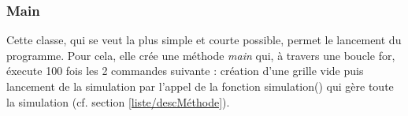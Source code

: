 \documentclass[french]{article}
\begin{document}


\subsubsection{Main}
Cette classe, qui se veut la plus simple et courte possible, permet le lancement du programme. Pour cela, elle crée une méthode \textit{main} qui, à travers une boucle for, éxecute 100 fois les 2 commandes suivante : création d'une grille vide puis lancement de la simulation par l'appel de la fonction simulation() qui gère toute la simulation (cf. section \ref{liste/descMéthode}).


\end{document}
